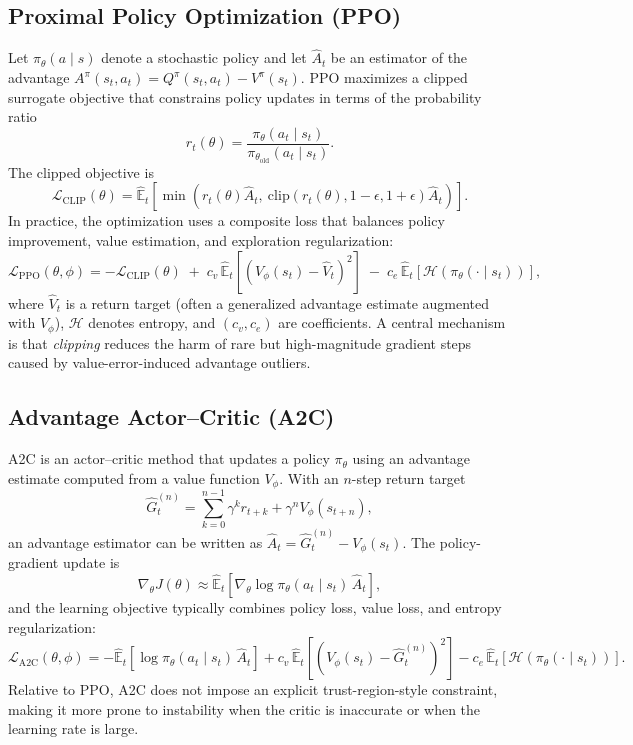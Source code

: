 \documentclass[a4paper,11pt,notitlepage]{report}
\begin{document}
\subsection{Proximal Policy Optimization (PPO)}
Let $\pi_\theta(a\mid s)$ denote a stochastic policy and let $\hat{A}_t$ be an estimator of the advantage $A^{\pi}(s_t,a_t)=Q^{\pi}(s_t,a_t)-V^{\pi}(s_t)$. PPO maximizes a clipped surrogate objective that constrains policy updates in terms of the probability ratio
\[
r_t(\theta)=\frac{\pi_\theta(a_t\mid s_t)}{\pi_{\theta_{\mathrm{old}}}(a_t\mid s_t)}.
\]
The clipped objective is
\[
\mathcal{L}_{\mathrm{CLIP}}(\theta)=\hat{\mathbb{E}}_t\left[\min\!\left(r_t(\theta)\hat{A}_t,\ \mathrm{clip}\!\left(r_t(\theta),1-\epsilon,1+\epsilon\right)\hat{A}_t\right)\right].
\]
In practice, the optimization uses a composite loss that balances policy improvement, value estimation, and exploration regularization:
\[
\mathcal{L}_{\mathrm{PPO}}(\theta,\phi)= -\mathcal{L}_{\mathrm{CLIP}}(\theta)\;+\;c_v\,\hat{\mathbb{E}}_t\!\left[(V_\phi(s_t)-\hat{V}_t)^2\right]\;-\;c_e\,\hat{\mathbb{E}}_t\!\left[\mathcal{H}(\pi_\theta(\cdot\mid s_t))\right],
\]
where $\hat{V}_t$ is a return target (often a generalized advantage estimate augmented with $V_\phi$), $\mathcal{H}$ denotes entropy, and $(c_v,c_e)$ are coefficients. A central mechanism is that \emph{clipping} reduces the harm of rare but high-magnitude gradient steps caused by value-error-induced advantage outliers.

\subsection{Advantage Actor--Critic (A2C)}
A2C is an actor--critic method that updates a policy $\pi_\theta$ using an advantage estimate computed from a value function $V_\phi$. With an $n$-step return target
\[
\hat{G}_t^{(n)}=\sum_{k=0}^{n-1}\gamma^k r_{t+k} + \gamma^n V_\phi(s_{t+n}),
\]
an advantage estimator can be written as $\hat{A}_t=\hat{G}_t^{(n)}-V_\phi(s_t)$. The policy-gradient update is
\[
\nabla_\theta J(\theta)\approx \hat{\mathbb{E}}_t\!\left[\nabla_\theta \log \pi_\theta(a_t\mid s_t)\,\hat{A}_t\right],
\]
and the learning objective typically combines policy loss, value loss, and entropy regularization:
\[
\mathcal{L}_{\mathrm{A2C}}(\theta,\phi)= -\hat{\mathbb{E}}_t\!\left[\log \pi_\theta(a_t\mid s_t)\,\hat{A}_t\right] + c_v\,\hat{\mathbb{E}}_t\!\left[(V_\phi(s_t)-\hat{G}_t^{(n)})^2\right] - c_e\,\hat{\mathbb{E}}_t\!\left[\mathcal{H}(\pi_\theta(\cdot\mid s_t))\right].
\]
Relative to PPO, A2C does not impose an explicit trust-region-style constraint, making it more prone to instability when the critic is inaccurate or when the learning rate is large.
\end{document}
